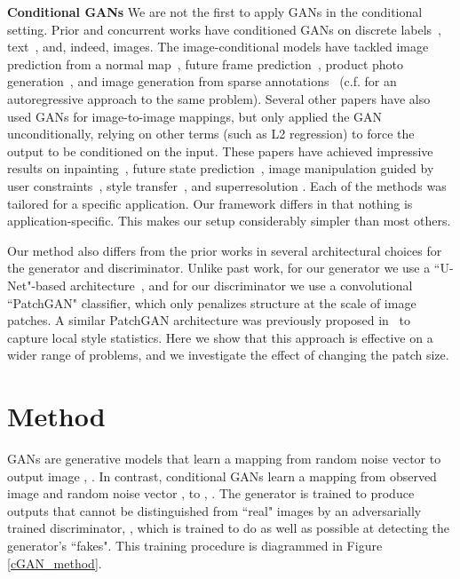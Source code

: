 \documentclass[10pt,twocolumn,letterpaper]{article}
\begin{document}
{\bf Conditional GANs}
We are not the first to apply GANs in the conditional setting. Prior and concurrent works have conditioned GANs on discrete labels~\cite{mirza2014conditional,gauthier2014conditional,denton2015deep}, text~\cite{reed2016generative}, and, indeed, images. The image-conditional models have tackled image prediction from a normal map~\cite{wang2016generative}, future frame prediction~\cite{mathieu2015deep}, product photo generation~\cite{yoo2016pixel}, and image generation from sparse annotations~\cite{karacan2016learning,reed2016learning} (c.f. \cite{reed2016generating} for an autoregressive approach to the same problem). Several other papers have also used GANs for image-to-image mappings, but only applied the GAN unconditionally, relying on other terms (such as L2 regression) to force the output to be conditioned on the input. These papers have achieved impressive results on inpainting~\cite{pathak2016context}, future state prediction~\cite{zhou2016learning}, image manipulation guided by user constraints~\cite{zhu2016generative}, style transfer~\cite{li2016precomputed}, and superresolution \cite{ledig2016photo}. Each of the methods was tailored for a specific application. Our framework differs in that nothing is application-specific. This makes our setup considerably simpler than most others.

Our method also differs from the prior works in several architectural choices for the generator and discriminator. Unlike past work, for our generator we use a ``U-Net"-based architecture~\cite{ronneberger2015u}, and for our discriminator we use a convolutional ``PatchGAN" classifier, which only penalizes structure at the scale of image patches. A similar PatchGAN architecture was previously proposed in~\cite{li2016precomputed} to capture local style statistics. Here we show that this approach is effective on a wider range of problems, and we investigate the effect of changing the patch size.




\section{Method}

GANs are generative models that learn a mapping from random noise vector  to output image ,  \cite{goodfellow2014generative}. In contrast, conditional GANs learn a mapping from observed image  and random noise vector , to , . The generator  is trained to produce outputs that cannot be distinguished from ``real" images by an adversarially trained discriminator, , which is trained to do as well as possible at detecting the generator's ``fakes". This training procedure is diagrammed in Figure \ref{cGAN_method}.
\end{document}
